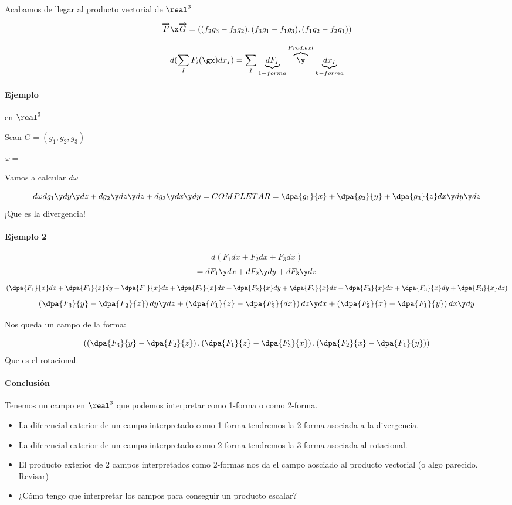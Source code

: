\obs Acabamos de llegar al producto vectorial de $\real^3$ 

\[\overrightarrow{F}\x\overrightarrow{G} = 
\left((f_2g_3-f_3g_2),(f_3g_1-f_1g_3),(f_1g_2 - f_2g_1)\right)\]

\begin{defn}

\[d(\sum_I F_i(\gx)dx_I) = \sum_I \underbrace{dF_I}_{1-forma} \overbrace{\y}^{Prod.ext} \underbrace{dx_I}_{k-forma}\]
\end{defn}

\paragraph{Ejemplo} en $\real^3$

Sean $G = (g_1,g_2,g_3)$

$\omega = $

Vamos a calcular $d\omega$

\[d\omega dg_1\y dy\y dz + dg_2 \y dz\y dz + dg_3 \y dx \y dy = COMPLETAR = \dpa{g_1}{x} + \dpa{g_2}{y}+\dpa{g_3}{z}dx\y dy\y dz\] ¡Que es la divergencia!

\paragraph{Ejemplo 2}

\[d(F_1 dx + F_2dx+F_3dx)\]
\[ = dF_1\y dx + dF_2 \y dy + dF_3\y dz\]
\[\left(\dpa{F_1}{x}dx + \dpa{F_1}{x}dy + \dpa{F_1}{x}dz +
\dpa{F_2}{x}dx + \dpa{F_2}{x}dy + \dpa{F_2}{x}dz+
\dpa{F_3}{x}dx + \dpa{F_3}{x}dy + \dpa{F_3}{x}dz\right)\]
\[\left(\dpa{F_3}{y} - \dpa{F_2}{z} \right)dy\y dz + \left(\dpa{F_1}{z} - \dpa{F_3}{dx}\right)dz \y dx + \left(\dpa{F_2}{x} - \dpa{F_1}{y}\right) dx \y dy\]

Nos queda un campo de la forma:

\[\left(\left(\dpa{F_3}{y} - \dpa{F_2}{z} \right) ,\left(\dpa{F_1}{z} - \dpa{F_3}{x}\right),\left(\dpa{F_2}{x} - \dpa{F_1}{y}\right)\right)\]
Que es el rotacional.

\paragraph{Conclusión}
Tenemos un campo en $\real^3$ que podemos interpretar como 1-forma o como 2-forma. 

\begin{itemize}
\item La diferencial exterior de un campo interpretado como 1-forma tendremos la 2-forma asociada a la divergencia.

\item La diferencial exterior de un campo interpretado como 2-forma tendremos la 3-forma asociada al rotacional.

\item El producto exterior de 2 campos interpretados como 2-formas nos da el campo aosciado al producto vectorial (o algo parecido. Revisar)

\item ¿Cómo tengo que interpretar los campos para conseguir un producto escalar?

\end{itemize} 


